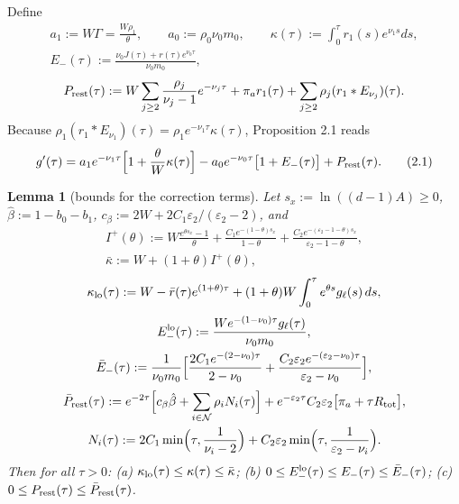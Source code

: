 \documentclass[11pt,a4paper]{article}
\newtheorem{lemma}[theorem]{Lemma}
\theoremstyle{definition}
\theoremstyle{remark}
\begin{document}
Define
\begin{gather*}
a_1:=W\Gamma=\frac{W\rho_1}{\theta}, \qquad a_0:=\rho_0\nu_0m_0, \qquad \kappa(\tau):=\int_0^\tau r_1(s)e^{\nu_1s}ds, \\
E_-(\tau):=\frac{\nu_0J(\tau)+r(\tau)e^{\nu_0\tau}}{\nu_0m_0},
\end{gather*}
\begin{equation*}
P_{\rm rest}(\tau):=W\sum_{j\ge2}\frac{\rho_j}{\nu_j-1}e^{-\nu_j\tau}+\pi_ar_1(\tau)+\sum_{j\ge2}\rho_j(r_1*E_{\nu_j})(\tau).
\end{equation*}
Because $\rho_1(r_1*E_{\nu_1})(\tau)=\rho_1e^{-\nu_1\tau}\kappa(\tau)$, Proposition 2.1 reads
\begin{equation*}
g'(\tau)=a_1e^{-\nu_1\tau}\Bigl[1+\frac{\theta}{W}\kappa(\tau)\Bigr]-a_0e^{-\nu_0\tau}\bigl[1+E_-(\tau)\bigr]+P_{\rm rest}(\tau). \tag{2.1}
\end{equation*}

\begin{lemma}[{bounds for the correction terms}]
Let $s_x:=\ln((d-1)A)\ge0$, $\hat\beta:=1-b_0-b_1$, $c_\beta:=2W+2C_1\varepsilon_2/(\varepsilon_2-2)$, and
\begin{gather*}
I^+(\theta):=W\frac{e^{\theta s_x}-1}{\theta}+\frac{C_1e^{-(1-\theta)s_x}}{1-\theta}+\frac{C_2e^{-(\varepsilon_2-1-\theta)s_x}}{\varepsilon_2-1-\theta}, \\
\bar\kappa:=W+(1+\theta)I^+(\theta),
\end{gather*}
\begin{equation*}
\kappa_{\rm lo}(\tau):=W-\bar r(\tau)e^{(1+\theta)\tau}+(1+\theta)W\int_0^\tau e^{\theta s}g_\ell(s)\,ds,
\end{equation*}
\begin{gather*}
E_-^{\rm lo}(\tau):=\frac{We^{-(1-\nu_0)\tau}g_\ell(\tau)}{\nu_0m_0}, \\
\bar E_-(\tau):=\frac{1}{\nu_0m_0}\Bigl[\frac{2C_1e^{-(2-\nu_0)\tau}}{2-\nu_0}+\frac{C_2\varepsilon_2e^{-(\varepsilon_2-\nu_0)\tau}}{\varepsilon_2-\nu_0}\Bigr],
\end{gather*}
\begin{gather*}
\bar P_{\rm rest}(\tau):=e^{-2\tau}\Bigl[c_\beta\hat\beta+\sum_{i\in\mathcal N}\rho_iN_i(\tau)\Bigr]+e^{-\varepsilon_2\tau}C_2\varepsilon_2\bigl[\pi_a+\tau R_{\rm tot}\bigr], \\
N_i(\tau):=2C_1\min\Bigl(\tau,\frac1{\nu_i-2}\Bigr)+C_2\varepsilon_2\min\Bigl(\tau,\frac1{\varepsilon_2-\nu_i}\Bigr).
\end{gather*}
Then for all $\tau>0$: (a) $\kappa_{\rm lo}(\tau)\le\kappa(\tau)\le\bar\kappa$; (b) $0\le E_-^{\rm lo}(\tau)\le E_-(\tau)\le\bar E_-(\tau)$; (c) $0\le P_{\rm rest}(\tau)\le\bar P_{\rm rest}(\tau)$.
\end{lemma}
\end{document}
